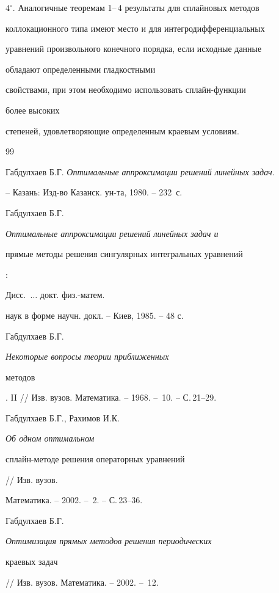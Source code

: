  


$4^\circ$. Аналогичные теоремам 1--\,4 результаты для сплайновых методов 


коллокационного типа имеют место и для интегродифференциальных 


уравнений произвольного конечного порядка, если исходные данные 


обладают определенными гладкостными 


свойствами, при этом необходимо использовать сплайн-функции 


более высоких 


степеней, удовлетворяющие определенным краевым условиям. 


 


 


\begin{thebibliography}{99} 


 




Габдулхаев Б.Г. {\em Оптимальные аппроксимации решений линейных задач}. 


-- Казань: Изд-во Казанск. ун-та, 1980. -- 232~с. 




Габдулхаев Б.Г. {\em Оптимальные аппроксимации решений линейных задач и 


прямые методы решения сингулярных интегральных уравнений}: 


Дисс.~$\dotsc$ докт. физ.-матем. 


наук в форме научн. докл. -- Киев, 1985. -- 48 с. 




Габдулхаев Б.Г. {\em Некоторые вопросы теории приближенных 


методов}. II // Изв. вузов. Математика. -- 1968. -- \No\,10. -- С.\,21--29. 




Габдулхаев Б.Г., Рахимов И.К. {\em Об одном оптимальном 


сплайн-методе решения операторных уравнений} // Изв. вузов. 


Математика. -- 2002. -- \No\,2. -- С.\,23--36. 




Габдулхаев Б.Г. {\em Оптимизация прямых методов решения периодических 


краевых задач} // Изв. вузов. Математика. -- 2002. -- \No\,12. 



\end{thebibliography}

